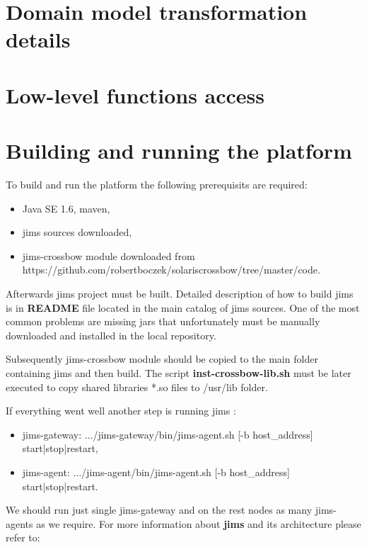 \documentclass[11pt]{book}
\begin{document}
        


    \section{Domain model transformation details}
        


    \section{Low-level functions access}


    \section{Building and running the platform}

        		To build and run the platform the following prerequisits are required:
		\begin{itemize}
			\item{Java SE 1.6, maven,}
			\item{jims sources downloaded,}
			\item{jims-crossbow module downloaded from \\ https://github.com/robertboczek/solaris\-crossbow/tree/master/code.}
		\end{itemize}
		
		Afterwards jims project must be built. Detailed description of how to build jims is in \textbf{README} file located
		in the main catalog of jims sources. One of the most common problems are missing jars that unfortunately must be 
		manually downloaded and installed in the local repository.
		
		
		Subsequently jims-crossbow module should be copied to the main folder containing jims and then build. The script 
		\textbf{inst-crossbow-lib.sh} must be	later executed to copy shared libraries *.so files to /usr/lib folder.
		
		If everything went well another step is running jims :
		\begin{itemize}
			\item{jims-gateway: .../jims-gateway/bin/jims-agent.sh [-b host\_address] start|stop|restart,}
			\item{jims-agent: .../jims-agent/bin/jims-agent.sh [-b host\_address] start|stop|restart.}
		\end{itemize}
		
		We should run just single jims-gateway and on the rest nodes as many jims-agents as we require. For more information about \textbf{jims} 
		and its architecture please refer to:
		
\end{document}
